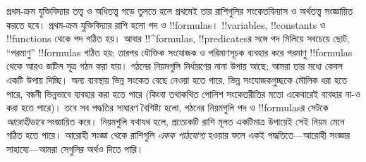 \documentclass[../../../include/open-logic-section]{subfiles}
\begin{document}


প্রথম-ক্রম যুক্তিবিদ্যার তত্ত্ব ও অধিতত্ত্ব গড়ে তুলতে হলে প্রথমেই তার
রাশিগুলির সংকেতবিন্যাস ও অর্থতত্ত্ব সংজ্ঞায়িত করতে হবে। প্রথম-ক্রম
যুক্তিবিদ্যার রাশি হলো পদ ও !!{formula}s। !!{variable}s,
!!{constant}s ও !!{function}s থেকে পদ গঠিত হয়। আবার !!^{formula}s,
!!{predicate}sর
সঙ্গে পদ মিলিয়ে সবচেয়ে ছোট, “পরমাণু” !!{formula}s গঠিত হয়; তারপর
যৌক্তিক সংযোজক ও পরিমাণসূচক ব্যবহার করে পরমাণু !!{formula}s থেকে আরও
জটিল সূত্র গঠন করা যায়। গঠনের নিয়মগুলি নির্ধারণের নানা উপায় আছে;
আমরা তার মধ্যে কেবল একটি উপায় দিচ্ছি। অন্য ব্যবস্থায় ভিন্ন সংকেত
বেছে নেওয়া হতে পারে, ভিন্ন সংযোজকগুচ্ছকে মৌলিক ধরা হতে পারে,
বন্ধনী ভিন্নভাবে ব্যবহার করা হতে পারে (কিংবা তথাকথিত পোলিশ সংকেতরীতির
মতো একেবারেই ব্যবহার না-ও করা হতে পারে)। তবে সব পদ্ধতির সাধারণ বৈশিষ্ট্য
হলো, গঠনের নিয়মগুলি পদ ও !!{formula}sর সেটকে \emph{আরোহীভাবে}
সংজ্ঞায়িত করে। নিয়মগুলি যথাযথ হলে, প্রত্যেকটি রাশি মূলত একটিমাত্র
উপায়েই সেই নিয়ম মেনে গঠিত হতে পারে। আরোহী সংজ্ঞা থেকে রাশিগুলি
\emph{একক পাঠযোগ্য} হওয়ার ফলে একই পদ্ধতিতে—আরোহী সংজ্ঞার সাহায্যে—আমরা
সেগুলির অর্থও দিতে পারি।
\end{document}
